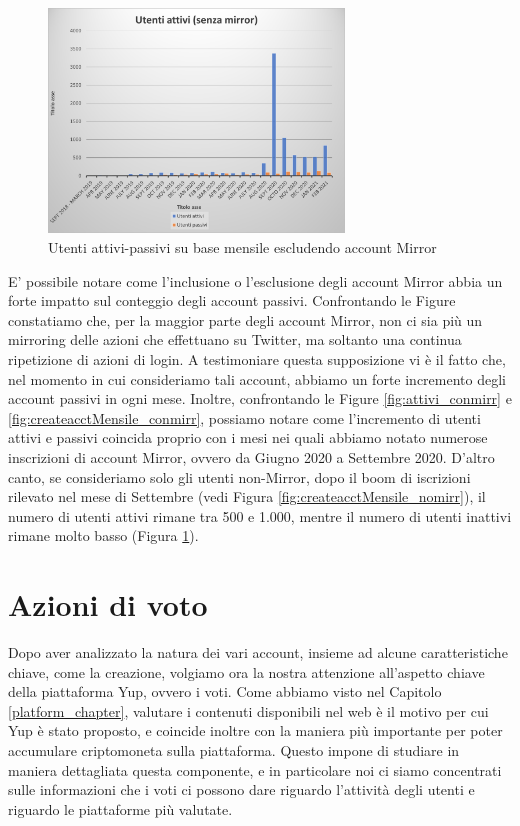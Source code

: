 \begin{figure}[t]
    \centering
    \includegraphics[width=0.7\textwidth]{graphs/utentiattivi_nomirr.png}
    \caption{Utenti attivi-passivi su base mensile escludendo account Mirror}
    \label{fig:attivi_nomirr}
\end{figure}

E' possibile notare come l'inclusione o l'esclusione degli account Mirror abbia un forte impatto sul conteggio degli account passivi. Confrontando le Figure constatiamo che, per la maggior parte degli account Mirror, non ci sia più un mirroring delle azioni che effettuano su Twitter, ma soltanto una continua ripetizione di azioni di login. A testimoniare questa supposizione vi è il fatto che, nel momento in cui consideriamo tali account, abbiamo un forte incremento degli account passivi in ogni mese. Inoltre, confrontando le Figure \ref{fig:attivi_conmirr} e \ref{fig:createacctMensile_conmirr}, possiamo notare come l'incremento di utenti attivi e passivi coincida proprio con i mesi nei quali abbiamo notato numerose inscrizioni di account Mirror, ovvero da Giugno 2020 a Settembre 2020.
D'altro canto, se consideriamo solo gli utenti non-Mirror, dopo il boom di iscrizioni rilevato nel mese di Settembre (vedi Figura \ref{fig:createacctMensile_nomirr}), il numero di utenti attivi rimane tra 500 e 1.000, mentre il numero di utenti inattivi rimane molto basso (Figura \ref{fig:attivi_nomirr}).

\section{Azioni di voto}
Dopo aver analizzato la natura dei vari account, insieme ad alcune caratteristiche chiave, come la creazione, volgiamo ora la nostra attenzione all'aspetto chiave della piattaforma Yup, ovvero i voti.
Come abbiamo visto nel Capitolo \ref{platform_chapter}, valutare i contenuti disponibili nel web è il motivo per cui Yup è stato proposto, e coincide inoltre con la maniera più importante per poter accumulare criptomoneta sulla piattaforma.
Questo impone di studiare in maniera dettagliata questa componente, e in particolare noi ci siamo concentrati sulle informazioni che i voti ci possono dare riguardo l'attività degli utenti e riguardo le piattaforme più valutate.

